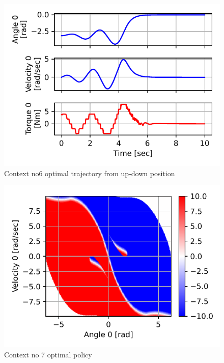 \begin{figure}[p]
\begin{center}
\includegraphics[width=0.99\linewidth]{fig/c6_traj.pdf}
\caption{Context no6 optimal trajectory from up-down position}\label{fig:c6_traj}
\end{center}
\end{figure}


\begin{figure}[p]
\begin{center}
\includegraphics[width=0.99\linewidth]{fig/c7_policy.pdf}
\caption{Context no 7 optimal policy}\label{fig:c7_policy}
\end{center}
\end{figure}


